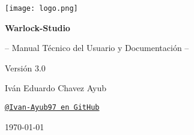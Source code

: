 \documentclass[11pt, a4paper]{article}
\begin{document}
\begin{titlepage}
    \begin{tcolorbox}[
        colback=WarlockDark,                    %
        colframe=WarlockGold,                   %
        sharp corners,                          %
        boxrule=1.5pt,                          %
        halign=center,                          %
        valign=center,                          %
        height=\dimexpr\textheight-1cm\relax    %
      ]
      \centering %

      \texttt{[image: logo.png]}\par %

      \vfill %

      \color{white} %

      {\Huge\bfseries Warlock-Studio\par}
      \vspace{0.7cm} %
      {\Large -- Manual Técnico del Usuario y Documentación --\par}
      \vspace{0.2cm}
      {\Large Versión 3.0\par}

      \vfill %

      {\large Iván Eduardo Chavez Ayub\par}
      \href{https://github.com/Ivan-Ayub97}{\texttt{\color{WarlockGold}@Ivan-Ayub97 en GitHub}}\par %

      \vspace{1.5cm}

      {\large \today\par} %
    \end{tcolorbox}
    \thispagestyle{empty} %
\end{titlepage}
\end{document}
